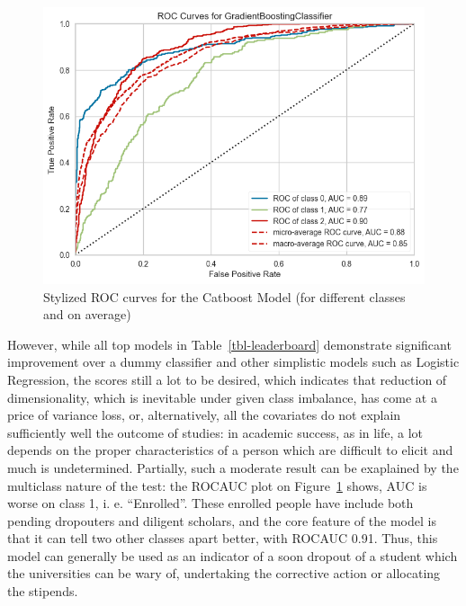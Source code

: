 \documentclass[
  letterpaper,
  DIV=11,
  numbers=noendperiod]{scrartcl}
\begin{document}
\begin{figure}

{\centering \includegraphics{report_AzadhdhinNedalYunisAlFraijat_files/figure-pdf/fig-rocauc-output-1.png}

}

\caption{\label{fig-rocauc}Stylized ROC curves for the Catboost Model
(for different classes and on average)}

\end{figure}

However, while all top models in Table~\ref{tbl-leaderboard} demonstrate
significant improvement over a dummy classifier and other simplistic
models such as Logistic Regression, the scores still a lot to be
desired, which indicates that reduction of dimensionality, which is
inevitable under given class imbalance, has come at a price of variance
loss, or, alternatively, all the covariates do not explain sufficiently
well the outcome of studies: in academic success, as in life, a lot
depends on the proper characteristics of a person which are difficult to
elicit and much is undetermined. Partially, such a moderate result can
be exaplained by the multiclass nature of the test: the ROCAUC plot on
Figure~\ref{fig-rocauc} shows, AUC is worse on class 1, i. e.
\enquote{Enrolled}. These enrolled people have include both pending
dropouters and diligent scholars, and the core feature of the model is
that it can tell two other classes apart better, with ROCAUC 0.91. Thus,
this model can generally be used as an indicator of a soon dropout of a
student which the universities can be wary of, undertaking the
corrective action or allocating the stipends.
\end{document}
